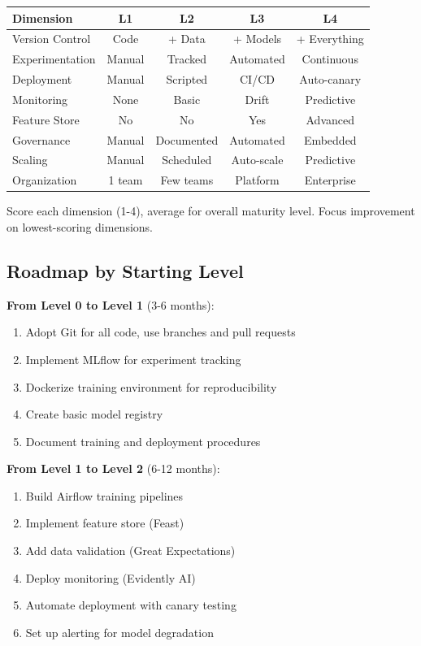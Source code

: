 \begin{table}[h]
\centering
\small
\begin{tabular}{lcccc}
\toprule
\textbf{Dimension} & \textbf{L1} & \textbf{L2} & \textbf{L3} & \textbf{L4} \\
\midrule
Version Control & Code & + Data & + Models & + Everything \\
Experimentation & Manual & Tracked & Automated & Continuous \\
Deployment & Manual & Scripted & CI/CD & Auto-canary \\
Monitoring & None & Basic & Drift & Predictive \\
Feature Store & No & No & Yes & Advanced \\
Governance & Manual & Documented & Automated & Embedded \\
Scaling & Manual & Scheduled & Auto-scale & Predictive \\
Organization & 1 team & Few teams & Platform & Enterprise \\
\bottomrule
\end{tabular}
\end{table}

Score each dimension (1-4), average for overall maturity level. Focus improvement on lowest-scoring dimensions.

\subsection{Roadmap by Starting Level}

\textbf{From Level 0 to Level 1} (3-6 months):
\begin{enumerate}
    \item Adopt Git for all code, use branches and pull requests
    \item Implement MLflow for experiment tracking
    \item Dockerize training environment for reproducibility
    \item Create basic model registry
    \item Document training and deployment procedures
\end{enumerate}

\textbf{From Level 1 to Level 2} (6-12 months):
\begin{enumerate}
    \item Build Airflow training pipelines
    \item Implement feature store (Feast)
    \item Add data validation (Great Expectations)
    \item Deploy monitoring (Evidently AI)
    \item Automate deployment with canary testing
    \item Set up alerting for model degradation
\end{enumerate}


